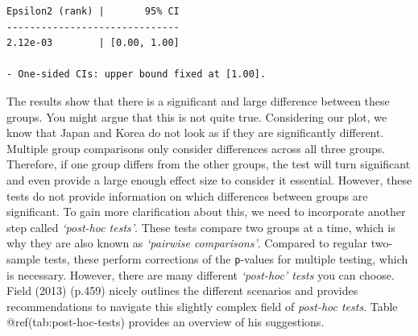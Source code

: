 \documentclass[
  letterpaper,
]{krantz}
\begin{document}
\begin{verbatim}
Epsilon2 (rank) |       95% CI
------------------------------
2.12e-03        | [0.00, 1.00]

- One-sided CIs: upper bound fixed at [1.00].
\end{verbatim}

The results show that there is a significant and large difference
between these groups. You might argue that this is not quite true.
Considering our plot, we know that Japan and Korea do not look as if
they are significantly different. Multiple group comparisons only
consider differences across all three groups. Therefore, if one group
differs from the other groups, the test will turn significant and even
provide a large enough effect size to consider it essential. However,
these tests do not provide information on which differences between
groups are significant. To gain more clarification about this, we need
to incorporate another step called \emph{`post-hoc tests'}. These tests
compare two groups at a time, which is why they are also known as
\emph{`pairwise comparisons'}. Compared to regular two-sample tests,
these perform corrections of the \texttt{p}-values for multiple testing,
which is necessary. However, there are many different \emph{`post-hoc'
tests} you can choose. Field (2013) (p.459) nicely outlines the
different scenarios and provides recommendations to navigate this
slightly complex field of \emph{post-hoc tests}. Table
@ref(tab:post-hoc-tests) provides an overview of his suggestions.
\end{document}
